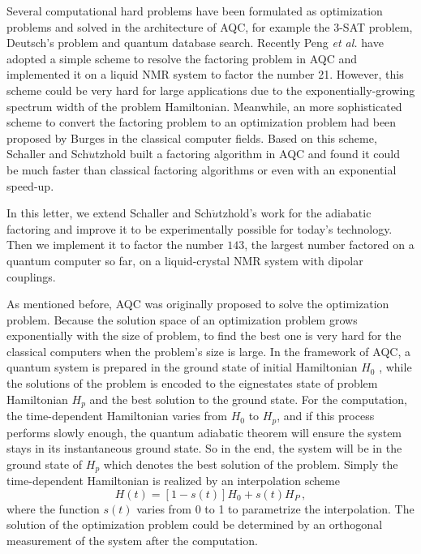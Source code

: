 \documentclass[twocolumn,showpacs,twoside,10pt,prl]{revtex4}
\begin{document}
Several computational hard problems have been formulated as
optimization problems and solved in the architecture of AQC, for
example the 3-SAT problem, Deutsch's problem and quantum database
search\cite{Farhi,Roland_2002,Das_2002,Xu_search,Steffen,Mitra_2005}.
Recently Peng \emph{et al.} \cite{peng_2008} have adopted a simple
scheme to resolve the factoring problem in AQC and implemented it on
a liquid NMR system to factor the number 21. However, this scheme
could be very hard for large applications due to the
exponentially-growing spectrum width of the problem Hamiltonian.
Meanwhile, an more sophisticated scheme to convert the factoring
problem to an optimization problem had been proposed by
Burges\cite{Burges} in the classical computer fields. Based on this
scheme, Schaller and Sch$\ddot{u}$tzhold \cite{Schutzhold,Schaller}
built a factoring algorithm in AQC and found it could be much faster
than classical factoring algorithms or even with an exponential
speed-up.


In this letter, we extend Schaller and Sch$\ddot{u}$tzhold's work
for the adiabatic factoring and improve it to be experimentally
possible for today's technology. Then we implement it to factor the
number $143$, the largest number factored on a quantum computer so
far, on a liquid-crystal NMR system with dipolar couplings.



As mentioned before, AQC was originally  proposed to solve the
optimization problem. Because the solution space of an optimization
problem grows exponentially with the size of problem, to find the
best one is very hard for the classical computers when the problem's
size is large. In the framework of AQC, a quantum system is
prepared in the ground state of initial Hamiltonian $H_0$ , while the
solutions of the problem is encoded to the eignestates state of problem Hamiltonian $H_p$
 and the best solution to the ground state. For the
computation, the time-dependent Hamiltonian varies from $H_0$ to $H_p$, and
if this process performs slowly enough, the quantum adiabatic
theorem will ensure the system stays in its instantaneous ground
state. So in the end, the system will be in the ground state of
$H_p$ which denotes the best solution of the problem. Simply the
time-dependent Hamiltonian is realized by an interpolation scheme
\begin{equation}
H(t)=[1-s(t)]H_{0}+s(t)H_{P}\,, \label{e.HSys}
\end{equation}
where the function $s(t)$ varies from 0 to 1 to parametrize the
interpolation. The solution of the optimization problem could
be determined by an orthogonal measurement of the system after the
computation.
\end{document}
